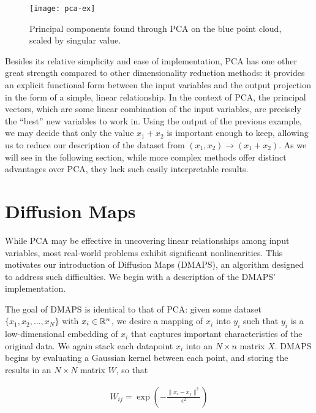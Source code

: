 \begin{figure}
  \centering
  \texttt{[image: pca-ex]}
  \caption{Principal components found through PCA on the blue point
    cloud, scaled by singular value. \label{fig:pca-ex}}
\end{figure}

Besides its relative simplicity and ease of implementation, PCA has
one other great strength compared to other dimensionality reduction
methods: it provides an explicit functional form between the input
variables and the output projection in the form of a simple, linear
relationship. In the context of PCA, the principal vectors, which are
some linear combination of the input variables, are precisely the
``best'' new variables to work in. Using the output of the previous
example, we may decide that only the value $x_1 + x_2$ is important
enough to keep, allowing us to reduce our description of the dataset
from $(x_1, x_2) \rightarrow (x_1 + x_2)$. As we will see in the
following section, while more complex methods offer distinct
advantages over PCA, they lack such easily interpretable results.

\section{Diffusion Maps \label{sec:dmaps}}

While PCA may be effective in uncovering linear relationships among
input variables, most real-world problems exhibit significant
nonlinearities. This motivates our introduction of Diffusion Maps
(DMAPS), an algorithm designed to address such difficulties. We begin
with a description of the DMAPS' implementation.

The goal of DMAPS is identical to that of PCA: given some dataset
$\{x_1, x_2, \hdots, x_N \}$ with $x_i \in \mathbb{R}^n$, we desire a mapping
of $x_i$ into $y_i$ such that $y_i$ is a low-dimensional embedding of
$x_i$ that captures important characteristics of the original data. We
again stack each datapoint $x_i$ into an $N \times n$ matrix
$X$. DMAPS begins by evaluating a Gaussian kernel between each point,
and storing the results in an $N \times N$ matrix $W$, so that

\begin{align}
  W_{ij} = \exp \left( -\frac{\|x_i - x_j\|^2}{\epsilon^2} \right)
\end{align}

